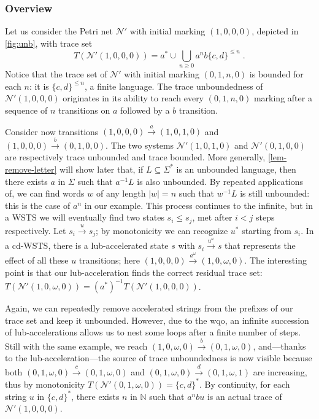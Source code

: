 \documentclass[11pt,reqno,a4paper]{amsart}
\newcommand{\ru}[1]{\xrightarrow{#1}}
\theoremstyle{plain}
\theoremstyle{definition}
\theoremstyle{remark}
\renewcommand{\paragraph}{\subsubsection*}
\begin{document}
\paragraph{Overview}
Let us consider the Petri net $\mathcal{N}'$ with
initial marking $(1,0,0,0)$, depicted in \autoref{fig:unb}, with trace set
\begin{equation*}
  T(\mathcal{N}'(1,0,0,0))=a^\ast\cup\bigcup_{n\geq 0}a^nb\{c,d\}^{\leq n}\;.
\end{equation*}
Notice that the trace set of $\mathcal{N}'$ with initial marking
$(0,1,n,0)$ is bounded for each $n$: it is $\{c,d\}^{\leq n}$,
a finite language.  The trace unboundedness of
$\mathcal{N}'(1,0,0,0)$ originates in its ability to reach every $(0,1,n,0)$
marking after a sequence of $n$ transitions on $a$ followed by a
$b$ transition.

Consider now transitions $(1,0,0,0)\ru{a}(1,0,1,0)$ and
$(1,0,0,0)\ru{b}(0,1,0,0)$.  The two systems $\mathcal{N}'(1,0,1,0)$
and $\mathcal{N}'(0,1,0,0)$ are respectively trace unbounded and trace
bounded.  More generally, \autoref{lem-remove-letter} will show later
that, if $L\subseteq\Sigma^\ast$ is an unbounded language, then there
exists $a$ in $\Sigma$ such that $a^{-1}L$ is also unbounded.  By
repeated applications of, we can find words $w$ of any length $|w|=n$
such that $w^{-1}L$ is still unbounded: this is the case of $a^n$ in
our example.  This process continues to the infinite, but in a WSTS we
will eventually find two states $s_i\leq s_j$, met after $i<j$ steps
respectively.  Let $s_i\ru{u}s_j$; by monotonicity we can recognize
$u^\ast$ starting from $s_i$.  In a cd-WSTS, there is a
lub-accelerated state $s$ with $s_i\ru{u^\omega}s$ that represents the
effect of all these $u$ transitions;
here $(1,0,0,0)\ru{a^\omega}(1,0,\omega,0)$.  The interesting
point is that our lub-acceleration finds the correct residual trace set:
$T(\mathcal{N}'(1,0,\omega,0))=(a^\ast)^{-1}T(\mathcal{N}'(1,0,0,0))$.


Again, we can repeatedly remove accelerated strings from the prefixes of
our trace set and keep it unbounded.  However, due to the wqo, an
infinite succession of lub-accelerations allows us to nest some loops
after a finite number of steps.  Still with the same example, we reach
$(1,0,\omega,0)\ru{b}(0,1,\omega,0)$, and---thanks to the
lub-acceleration---the source of trace unboundedness is now
visible because both $(0,1,\omega,0)\ru{c}(0,1,\omega,0)$ and
$(0,1,\omega,0)\ru{d}(0,1,\omega,1)$ are increasing,
thus by monotonicity $T(\mathcal{N}'(0,1,\omega,0))=\{c,d\}^\ast$.  By
continuity, for each string $u$ in $\{c,d\}^\ast$, there exists $n$ in
$\mathbb{N}$ such that $a^{n}bu$ is an actual trace of
$\mathcal{N}'(1,0,0,0)$.
\end{document}
